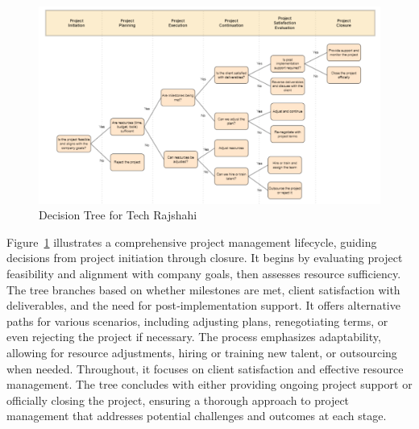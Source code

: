 \documentclass[12pt,a4paper]{article}
\begin{document}
\begin{figure}[H]
    \centering
    \includegraphics[width=\textwidth]{Fig/DT.png}
        \caption{Decision Tree for Tech Rajshahi}
    \label{fig:decision_tree_tech}
\end{figure}

Figure~\ref{fig:decision_tree_tech} illustrates a comprehensive project management lifecycle, guiding decisions from project initiation through closure.  It begins by evaluating project feasibility and alignment with company goals, then assesses resource sufficiency.  The tree branches based on whether milestones are met, client satisfaction with deliverables, and the need for post‑implementation support.  It offers alternative paths for various scenarios, including adjusting plans, renegotiating terms, or even rejecting the project if necessary.  The process emphasizes adaptability, allowing for resource adjustments, hiring or training new talent, or outsourcing when needed.  Throughout, it focuses on client satisfaction and effective resource management.  The tree concludes with either providing ongoing project support or officially closing the project, ensuring a thorough approach to project management that addresses potential challenges and outcomes at each stage.
\end{document}
